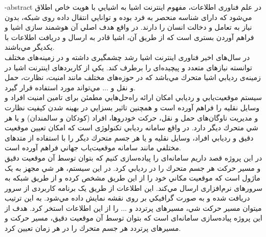 
 
\surname{}

\fa-abstract{
در علم فناوری اطلاعات، مفهوم اينترنت اشيا به اشيايي با هويت خاص اطلاق مي‌شود كه دارای شناسه منحصر به فرد بوده و توانايي انتقال داده روی شبکه، بدون نياز به تعامل و دخالت انسان را دارند. در واقع هدف اصلي آن هوشمند سازی اشيا و فراهم آوردن بستری است كه از طريق آن،
اشيا قادر به ارسال و دريافت اطلاعات با يکديگر مي‌باشند.
\\
در سال‌های اخير فناوری اينترنت اشيا رشد چشمگيری داشته و در زمينه‌های مختلف توانسته نيازهای متعدد و پيچيده‌ای را برطرف كند. يکي از كاربردهای اينترنت اشيا در زمينه‌ی ‌‌رديابي اشيا متحرك مي‌باشد كه در حوزه‌های مختلف مانند امنيت، نظارت، حمل و نقل و ... مي‌تواند مورد استفاده قرار گيرد.
\\
سيستم موقعيت‌يابي و رديابي امکان ارائه راه‌حل‌هايي مطمئن برای تامين امنيت افراد و وسايل نقليه را فراهم آورده است و همچنين تاثير بسزايي در بهينه شدن كيفيت نظارت و مديريت ناوگان‌های حمل و نقل، حركت خودروها، افراد (کودکان و سالمندان) و يا هر شي متحرك ديگر دارد. در واقع سامانه رديابي تکنولوژی است كه امکان تعيين موقعيت دقيق و رديابي افراد، وسايل نقليه و يا هر جسم متحرك ديگر را با استفاده از متدهای مختلفي مانند
سامانه موقعيت‌ياب جهاني فراهم آورده است.
\\
در اين پروژه قصد داريم سامانه‌ای را پياده‌سازی كنيم كه بتوان توسط آن موقعيت دقيق و مسير حركت هر جسم متحرك را در رديابي كرد. در اين سيستم، هر شي مجهز به يک ماژول  است كه موقعيت مکاني خود را از این طریق مشخص کرده و از طريق شبکه  به سرورهای نرم‌افزاری ارسال مي‌كند. اين اطلاعات از طريق يک برنامه كاربردی از سرور دريافت شده و به صورت گرافيکي بر روی نقشه نمايش داده مي‌شود. به اين ترتيب ميتوان مسير حركت
شي، مسيرهای پرتردد و ... را از اين اطلاعات استخر كرد.
هدف از این پروژه پياده‌سازی سامانه‌ای است كه بتوان توسط آن موقعيت دقيق، مسير حركت و مسیرهای پرتردد هر جسم متحرك را در هر زمان تعيين كرد.
}


